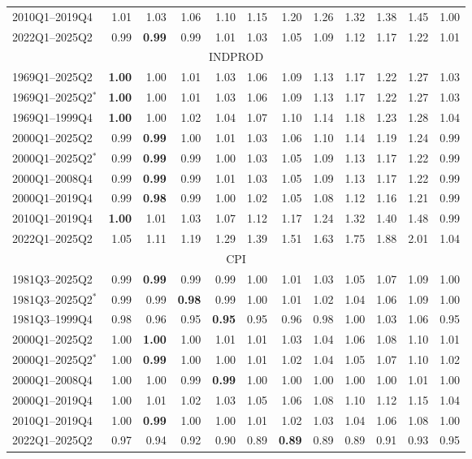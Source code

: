 \begin{tabular}{lrrrrrrrrrrr}
2010Q1--2019Q4 & 1.01 & 1.03 & 1.06 & 1.10 & 1.15 & 1.20 & 1.26 & 1.32 & 1.38 & 1.45 & 1.00 \\
2022Q1--2025Q2 & 0.99 & \textbf{0.99} & 0.99 & 1.01 & 1.03 & 1.05 & 1.09 & 1.12 & 1.17 & 1.22 & 1.01 \\
\hline
\multicolumn{12}{c}{INDPROD} \\
1969Q1--2025Q2 & \textbf{1.00} & 1.00 & 1.01 & 1.03 & 1.06 & 1.09 & 1.13 & 1.17 & 1.22 & 1.27 & 1.03 \\
1969Q1--2025Q2$^*$ & \textbf{1.00} & 1.00 & 1.01 & 1.03 & 1.06 & 1.09 & 1.13 & 1.17 & 1.22 & 1.27 & 1.03 \\
1969Q1--1999Q4 & \textbf{1.00} & 1.00 & 1.02 & 1.04 & 1.07 & 1.10 & 1.14 & 1.18 & 1.23 & 1.28 & 1.04 \\
2000Q1--2025Q2 & 0.99 & \textbf{0.99} & 1.00 & 1.01 & 1.03 & 1.06 & 1.10 & 1.14 & 1.19 & 1.24 & 0.99 \\
2000Q1--2025Q2$^*$ & 0.99 & \textbf{0.99} & 0.99 & 1.00 & 1.03 & 1.05 & 1.09 & 1.13 & 1.17 & 1.22 & 0.99 \\
2000Q1--2008Q4 & 0.99 & \textbf{0.99} & 0.99 & 1.01 & 1.03 & 1.05 & 1.09 & 1.13 & 1.17 & 1.22 & 0.99 \\
2000Q1--2019Q4 & 0.99 & \textbf{0.98} & 0.99 & 1.00 & 1.02 & 1.05 & 1.08 & 1.12 & 1.16 & 1.21 & 0.99 \\
2010Q1--2019Q4 & \textbf{1.00} & 1.01 & 1.03 & 1.07 & 1.12 & 1.17 & 1.24 & 1.32 & 1.40 & 1.48 & 0.99 \\
2022Q1--2025Q2 & 1.05 & 1.11 & 1.19 & 1.29 & 1.39 & 1.51 & 1.63 & 1.75 & 1.88 & 2.01 & 1.04 \\
\hline
\multicolumn{12}{c}{CPI} \\
1981Q3--2025Q2 & 0.99 & \textbf{0.99} & 0.99 & 0.99 & 1.00 & 1.01 & 1.03 & 1.05 & 1.07 & 1.09 & 1.00 \\
1981Q3--2025Q2$^*$ & 0.99 & 0.99 & \textbf{0.98} & 0.99 & 1.00 & 1.01 & 1.02 & 1.04 & 1.06 & 1.09 & 1.00 \\
1981Q3--1999Q4 & 0.98 & 0.96 & 0.95 & \textbf{0.95} & 0.95 & 0.96 & 0.98 & 1.00 & 1.03 & 1.06 & 0.95 \\
2000Q1--2025Q2 & 1.00 & \textbf{1.00} & 1.00 & 1.01 & 1.01 & 1.03 & 1.04 & 1.06 & 1.08 & 1.10 & 1.01 \\
2000Q1--2025Q2$^*$ & 1.00 & \textbf{0.99} & 1.00 & 1.00 & 1.01 & 1.02 & 1.04 & 1.05 & 1.07 & 1.10 & 1.02 \\
2000Q1--2008Q4 & 1.00 & 1.00 & 0.99 & \textbf{0.99} & 1.00 & 1.00 & 1.00 & 1.00 & 1.00 & 1.01 & 1.00 \\
2000Q1--2019Q4 & 1.00 & 1.01 & 1.02 & 1.03 & 1.05 & 1.06 & 1.08 & 1.10 & 1.12 & 1.15 & 1.04 \\
2010Q1--2019Q4 & 1.00 & \textbf{0.99} & 1.00 & 1.00 & 1.01 & 1.02 & 1.03 & 1.04 & 1.06 & 1.08 & 1.00 \\
2022Q1--2025Q2 & 0.97 & 0.94 & 0.92 & 0.90 & 0.89 & \textbf{0.89} & 0.89 & 0.89 & 0.91 & 0.93 & 0.95 \\
\hline
\end{tabular}
